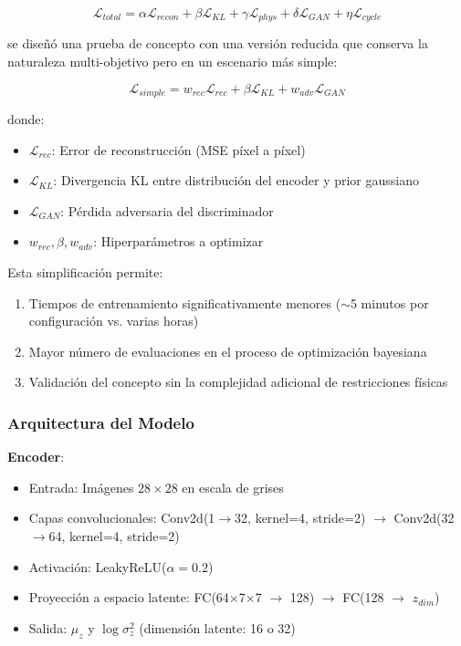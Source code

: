 \documentclass[12pt]{article}
\begin{document}
\begin{equation}
\mathcal{L}_{total} = \alpha \mathcal{L}_{recon} + \beta \mathcal{L}_{KL} + \gamma \mathcal{L}_{phys} + \delta \mathcal{L}_{GAN} + \eta \mathcal{L}_{cycle}
\end{equation}

se diseñó una prueba de concepto con una versión reducida que conserva la naturaleza multi-objetivo pero en un escenario más simple:

\begin{equation}
\mathcal{L}_{simple} = w_{rec} \mathcal{L}_{rec} + \beta \mathcal{L}_{KL} + w_{adv} \mathcal{L}_{GAN}
\end{equation}

donde:
\begin{itemize}
    \item $\mathcal{L}_{rec}$: Error de reconstrucción (MSE píxel a píxel)
    \item $\mathcal{L}_{KL}$: Divergencia KL entre distribución del encoder y prior gaussiano
    \item $\mathcal{L}_{GAN}$: Pérdida adversaria del discriminador
    \item $w_{rec}, \beta, w_{adv}$: Hiperparámetros a optimizar
\end{itemize}

Esta simplificación permite:
\begin{enumerate}
    \item Tiempos de entrenamiento significativamente menores ($\sim$5 minutos por configuración vs. varias horas)
    \item Mayor número de evaluaciones en el proceso de optimización bayesiana
    \item Validación del concepto sin la complejidad adicional de restricciones físicas
\end{enumerate}

\subsubsection{Arquitectura del Modelo}

\textbf{Encoder}:
\begin{itemize}
    \item Entrada: Imágenes $28 \times 28$ en escala de grises
    \item Capas convolucionales: Conv2d(1$\to$32, kernel=4, stride=2) $\to$ Conv2d(32$\to$64, kernel=4, stride=2)
    \item Activación: LeakyReLU($\alpha=0.2$)
    \item Proyección a espacio latente: FC(64$\times$7$\times$7 $\to$ 128) $\to$ FC(128 $\to$ $z_{dim}$)
    \item Salida: $\mu_z$ y $\log\sigma^2_z$ (dimensión latente: 16 o 32)
\end{itemize}
\end{document}
